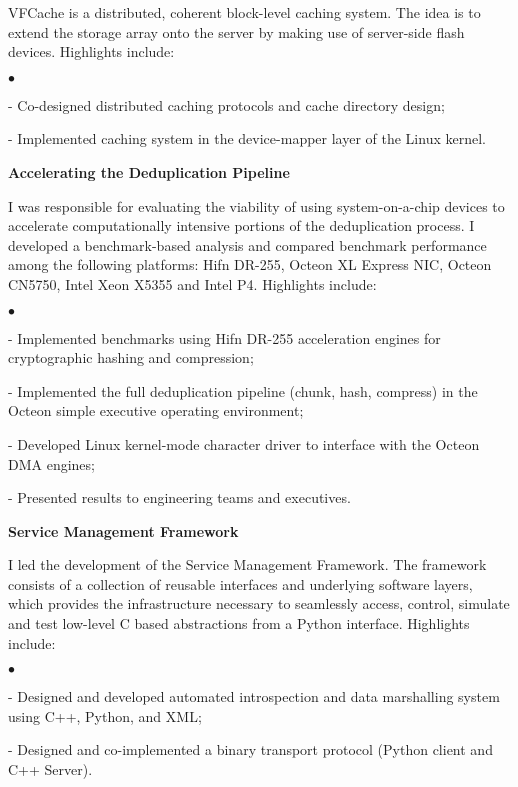 \documentclass[8pt]{article}
\newenvironment{achievements}{\begin{list}{$\bullet$}{\topsep 0pt \itemsep -2pt}}{\vspace*{2pt}\end{list}}
\begin{document}
VFCache is a distributed, coherent block-level caching system.  The idea is to extend the storage array onto the server by making use of server-side flash devices.  Highlights include:
\begin{achievements}
\item[-]Co-designed distributed caching protocols and cache directory design;
\item[-]Implemented caching system in the device-mapper layer of the
  Linux kernel.
\end{achievements}

\textbf{\normalsize Accelerating the Deduplication Pipeline}

I was responsible for evaluating the viability of using
system-on-a-chip devices to accelerate computationally intensive
portions of the deduplication process.  I developed a benchmark-based
analysis and compared benchmark performance among the following
platforms: Hifn DR-255, Octeon XL Express NIC, Octeon CN5750, Intel
Xeon X5355 and Intel P4.  Highlights include:
\begin{achievements}
\item[-]Implemented benchmarks using Hifn DR-255 acceleration engines for
  cryptographic hashing and compression;
\item[-]Implemented the full deduplication pipeline (chunk, hash, compress) in the Octeon simple
  executive operating environment;
\item[-]Developed Linux kernel-mode character driver to interface with
  the Octeon DMA engines;
\item[-]Presented results to engineering teams and executives.
\end{achievements}

\textbf{\normalsize Service Management Framework}

I led the development of the Service Management Framework.  The
framework consists of a collection of reusable interfaces and
underlying software layers, which provides the infrastructure
necessary to seamlessly access, control, simulate and test low-level C
based abstractions from a Python interface.  Highlights include:

\begin{achievements}
\item[-]Designed and developed automated introspection and data marshalling system using C++, Python, and XML;
  \item[-]Designed and co-implemented a binary transport protocol (Python client and C++ Server).
\end{achievements}
\end{document}
